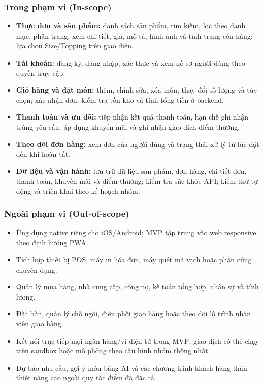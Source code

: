 \subsubsection{Trong phạm vi (In-scope)}
\begin{itemize}
    \item \textbf{Thực đơn và sản phẩm:} danh sách sản phẩm, tìm kiếm, lọc theo danh mục, phân trang, xem chi tiết, giá, mô tả, hình ảnh và tình trạng còn hàng; lựa chọn Size/Topping trên giao diện.
    \item \textbf{Tài khoản:} đăng ký, đăng nhập, xác thực và xem hồ sơ người dùng theo quyền truy cập.
    \item \textbf{Giỏ hàng và đặt món:} thêm, chỉnh sửa, xóa món; thay đổi số lượng và tùy chọn; xác nhận đơn; kiểm tra tồn kho và tính tổng tiền ở backend.
    \item \textbf{Thanh toán và ưu đãi:} tiếp nhận kết quả thanh toán, hạn chế ghi nhận trùng yêu cầu, áp dụng khuyến mãi và ghi nhận giao dịch điểm thưởng.
    \item \textbf{Theo dõi đơn hàng:} xem đơn của người dùng và trạng thái xử lý từ lúc đặt đến khi hoàn tất.
    \item \textbf{Dữ liệu và vận hành:} lưu trữ dữ liệu sản phẩm, đơn hàng, chi tiết đơn, thanh toán, khuyến mãi và điểm thưởng; kiểm tra sức khỏe API; kiểm thử tự động và triển khai theo kế hoạch nhóm.
\end{itemize}

\subsubsection{Ngoài phạm vi (Out-of-scope)}
\begin{itemize}
    \item Ứng dụng native riêng cho iOS/Android; MVP tập trung vào web responsive theo định hướng PWA.
    \item Tích hợp thiết bị POS, máy in hóa đơn, máy quét mã vạch hoặc phần cứng chuyên dụng.
    \item Quản lý mua hàng, nhà cung cấp, công nợ, kế toán tổng hợp, nhân sự và tính lương.
    \item Đặt bàn, quản lý chỗ ngồi, điều phối giao hàng hoặc theo dõi lộ trình nhân viên giao hàng.
    \item Kết nối trực tiếp mọi ngân hàng/ví điện tử trong MVP; giao dịch có thể chạy trên sandbox hoặc mô phỏng theo cấu hình nhóm thống nhất.
    \item Dự báo nhu cầu, gợi ý món bằng AI và các chương trình khách hàng thân thiết nâng cao ngoài quy tắc điểm đã đặc tả.
\end{itemize}

